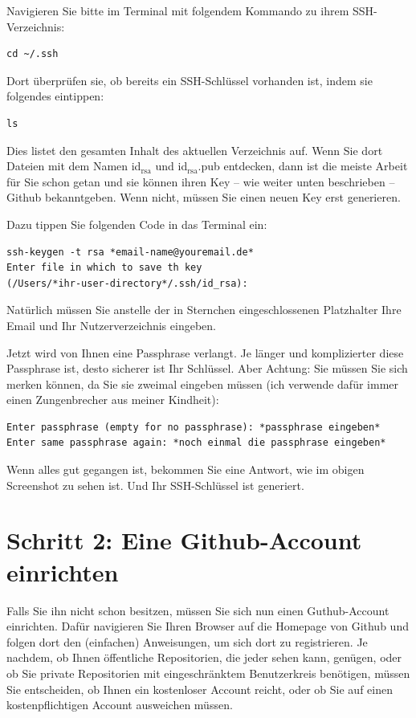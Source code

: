 \documentclass[11pt]{report}
\begin{document}
Navigieren Sie bitte im Terminal mit folgendem Kommando zu ihrem SSH-Verzeichnis:


\begin{verbatim}
cd ~/.ssh
\end{verbatim}

Dort überprüfen sie, ob bereits ein SSH-Schlüssel vorhanden ist, indem
sie folgendes eintippen:


\begin{verbatim}
ls
\end{verbatim}

Dies listet den gesamten Inhalt des aktuellen Verzeichnis auf. Wenn
Sie dort Dateien mit dem Namen id$_{\mathrm{rsa}}$ und id$_{\mathrm{rsa}}$.pub entdecken, dann
ist die meiste Arbeit für Sie schon getan und sie können ihren Key –
wie weiter unten beschrieben – Github bekanntgeben. Wenn nicht, müssen
Sie einen neuen Key erst generieren.


Dazu tippen Sie folgenden Code in das Terminal ein:


\begin{verbatim}
ssh-keygen -t rsa *email-name@youremail.de* 
Enter file in which to save th key
(/Users/*ihr-user-directory*/.ssh/id_rsa):
\end{verbatim}

Natürlich müssen Sie anstelle der in Sternchen eingeschlossenen
Platzhalter Ihre Email und Ihr Nutzerverzeichnis eingeben.


Jetzt wird von Ihnen eine Passphrase verlangt. Je länger und
komplizierter diese Passphrase ist, desto sicherer ist Ihr
Schlüssel. Aber Achtung: Sie müssen Sie sich merken können, da Sie sie
zweimal eingeben müssen (ich verwende dafür immer einen Zungenbrecher
aus meiner Kindheit):


\begin{verbatim}
Enter passphrase (empty for no passphrase): *passphrase eingeben*
Enter same passphrase again: *noch einmal die passphrase eingeben*
\end{verbatim}

Wenn alles gut gegangen ist, bekommen Sie eine Antwort, wie im obigen
Screenshot zu sehen ist. Und Ihr SSH-Schlüssel ist generiert.
\section{Schritt 2: Eine Github-Account einrichten}
\label{sec-2-11-2}


Falls Sie ihn nicht schon besitzen, müssen Sie sich nun einen
Guthub-Account einrichten. Dafür navigieren Sie Ihren Browser auf die
Homepage von Github und folgen dort den (einfachen) Anweisungen, um
sich dort zu registrieren. Je nachdem, ob Ihnen öffentliche
Repositorien, die jeder sehen kann, genügen, oder ob Sie private
Repositorien mit eingeschränktem Benutzerkreis benötigen, müssen Sie
entscheiden, ob Ihnen ein kostenloser Account reicht, oder ob Sie auf
einen kostenpflichtigen Account ausweichen müssen.
\end{document}
